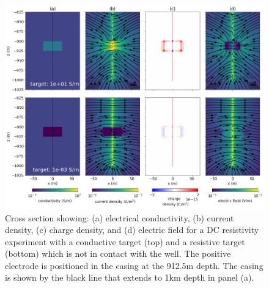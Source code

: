 \begin{figure}
    \begin{center}
    \includegraphics[width=\textwidth]{figures/offset_target_physics.png}
    \end{center}
\caption{
    Cross section showing: (a) electrical conductivity, (b) current density, (c) charge density, and
    (d) electric field for a DC resistivity experiment with a conductive target (top)
    and a resistive target (bottom) which is not in contact with the well.
    The positive electrode is positioned in the casing at the 912.5m depth.
    The casing is shown by the black line that extends to 1km
    depth in panel (a).
}
\label{fig:offset_target_physics}
\end{figure}
